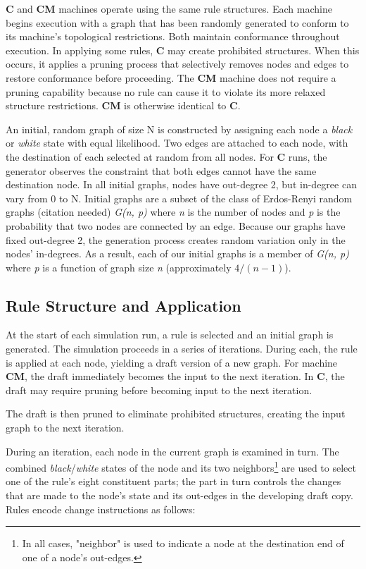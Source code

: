 \documentclass{tufte-handout}
\begin{document}
\textbf{C} and \textbf{CM} machines operate using the same rule structures.
Each machine begins execution with a graph that has been randomly generated
to conform to its machine's topological restrictions. Both maintain conformance
throughout execution. In applying some rules, \textbf{C} may create prohibited
structures. When this occurs, it applies a pruning process that selectively
removes nodes and edges to restore conformance before proceeding. The \textbf{CM}
machine does not require a pruning capability because no rule can cause it to
violate its more relaxed structure restrictions. \textbf{CM} is otherwise
identical to \textbf{C}.  

An initial, random graph of size N is constructed by assigning each node
a \textit{black} or \textit{white} state with equal likelihood.
Two edges are attached to each node, with
the destination of each selected at random from all nodes. For \textbf{C} runs, the
generator observes the constraint that both edges cannot have the same destination node.
In all initial graphs, nodes have out-degree 2, but in-degree can vary from 0 to N.
Initial graphs are a subset of the class of Erdos-Renyi random graphs (citation needed)
\textit{G(n, p)} where \textit{n} is the number of nodes and \textit{p} is the probability
that two nodes are connected by an edge. Because our graphs have fixed out-degree 2,
the generation process creates random variation only in the nodes' in-degrees. As a result,
each of our initial graphs is a member of \textit{G(n, p)} where \textit{p} is a function
of graph size \textit{n} (approximately \( 4 / (n - 1) \)).

\subsection{Rule Structure and Application}

At the start of each simulation run, a rule is selected and an initial graph
is generated.  The simulation proceeds in a series of
iterations. During each, the rule is applied at each node, yielding a draft
version of a new graph. For machine \textbf{CM}, the draft immediately becomes
the input to the next iteration. In \textbf{C}, the draft may require pruning
before becoming input to the next iteration. 

The draft is then pruned to eliminate
prohibited structures, creating the input graph to the next iteration.

During an iteration, each node in the current graph is examined in turn.
The combined \textit{black}/\textit{white} states of the node and its two neighbors\footnote{In
all cases, "neighbor" is used to indicate a node at the destination end of one of a node's out-edges.}
are used to select one of the rule's eight constituent parts; the part in turn
controls the changes that are made to the node's state and its out-edges in
the developing draft copy. Rules encode change instructions as follows:
\end{document}
